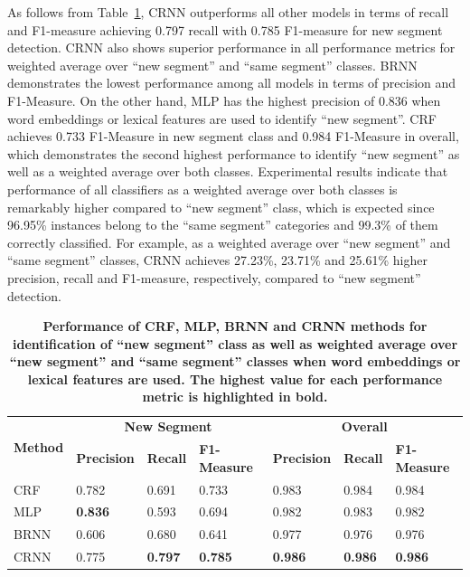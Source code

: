\documentclass{amia}
\begin{document}
As follows from Table~\ref{tab:result_base}, CRNN outperforms all other models in terms of recall and F1-measure achieving 0.797 recall with 0.785 F1-measure for new segment detection. CRNN also shows superior performance in all performance metrics for weighted average over ``new segment'' and ``same segment'' classes. BRNN demonstrates the lowest performance among all models in terms of precision and F1-Measure. On the other hand, MLP has the highest precision of 0.836 when word embeddings or lexical features are used to identify ``new segment''. CRF achieves 0.733 F1-Measure in new segment class and 0.984 F1-Measure in overall, which demonstrates the second highest performance to identify ``new segment'' as well as a weighted average over both classes. Experimental results indicate that performance of all classifiers as a weighted average over both classes is remarkably higher compared to ``new segment'' class, which is expected since 96.95\% instances belong to the ``same segment'' categories and 99.3\% of them correctly classified. For example, as a weighted average over ``new segment'' and ``same segment'' classes, CRNN achieves 27.23\%, 23.71\% and 25.61\% higher precision, recall and F1-measure, respectively, compared to ``new segment'' detection. \\

\begin{table}[ht]
\centering
\caption{\textbf{Performance of CRF, MLP, BRNN and CRNN methods for identification of ``new segment'' class as well as weighted average over ``new segment'' and ``same segment'' classes when word embeddings or lexical features are used. The highest value for each performance metric is highlighted in bold.}}
\label{tab:result_base}
  \begin{tabular}{|l|l|l|l|l|l|l|}
  \hline
   \multirow{2}{*}{\textbf{Method}} & \multicolumn{3}{|c|}{\textbf{New Segment}} & \multicolumn{3}{|c|}{\textbf{Overall}} \\\cline{2-7}
   & \textbf{Precision}  & \textbf{Recall} & \textbf{F1-Measure} & \textbf{Precision}  & \textbf{Recall} & \textbf{F1-Measure} \\ \hline    
 CRF & 0.782 & 0.691 & 0.733 & 0.983 & 0.984 & 0.984 \\ \hline
 MLP & \textbf{0.836} & 0.593 & 0.694 & 0.982 & 0.983 & 0.982 \\ \hline
 BRNN & 0.606 & 0.680 & 0.641 & 0.977 & 0.976 & 0.976 \\ \hline
 CRNN & 0.775 & \textbf{0.797} & \textbf{0.785} & \textbf{0.986} & \textbf{0.986} & \textbf{0.986} \\ \hline
  \end{tabular}
\end{table}                         
\end{document}
